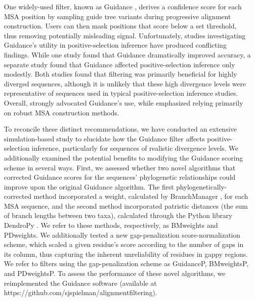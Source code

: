 \documentclass[11pt]{article}
\begin{document}
One widely-used filter, known as Guidance \citep{Penn2010}, derives a confidence score for each MSA position by sampling guide tree variants during progressive alignment construction. Users can then mask positions that score below a set threshold, thus removing potentially misleading signal. Unfortunately, studies investigating Guidance's utility in positive-selection inference have produced conflicting findings. While one study \citep{Privman2012} found that Guidance dramatically improved accuracy, a separate study \citep{Jordan2012} found that Guidance affected positive-selection inference only modestly. Both studies found that filtering was primarily beneficial for highly diverged sequences, although it is unlikely that these high divergence levels were representative of sequences used in typical positive-selection inference studies. Overall, \citet{Privman2012} strongly advocated Guidance's use, while \citet{Jordan2012} emphasized relying primarily on robust MSA construction methods. 

To reconcile these distinct recommendations, we have conducted an extensive simulation-based study to elucidate how the Guidance filter affects positive-selection inference, particularly for sequences of realistic divergence levels. We additionally examined the potential benefits to modifying the Guidance scoring scheme in several ways.  First, we assessed whether two novel algorithms that corrected Guidance scores for the sequences' phylogenetic relationships could improve upon the original Guidance algorithm. The first phylogenetically-corrected method incorporated a weight, calculated by BranchManager \citep{Stone2007}, for each MSA sequence, and the second method incorporated patristic distances (the sum of branch lengths between two taxa), calculated through the Python library DendroPy \citep{Sukumaran2010}. We refer to these methods, respectively, as BMweights and PDweights. We additionally tested a new gap-penalization score-normalization scheme, which scaled a given residue's score according to the number of gaps in its column, thus capturing the inherent unreliability of residues in gappy regions. We refer to filters using the gap-penalization scheme as GuidanceP, BMweightsP, and PDweightsP. To assess the performance of these novel algorithms, we reimplemented the Guidance software (available at https://github.com/sjspielman/alignment\underline{\hspace*{0.2cm}}filtering). 
\end{document}

